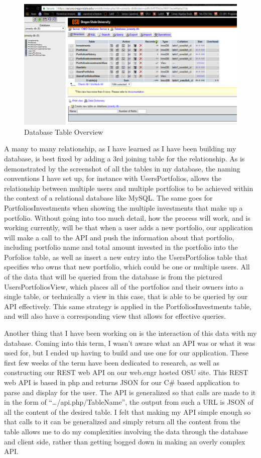 \documentclass[letterpaper,10pt,titlepage,journal,compsoc,draftclsnofoot,onecolumn]{IEEEtran}
\begin{document}
\begin{figure}[h]
\caption{Database Table Overview}
\centering
\includegraphics[width=\textwidth]{database_overview}
\end{figure}
A many to many relationship, as I have learned as I have been building my database, is best fixed by adding a 3rd joining table for the relationship. As is demonstrated by the screenshot of all the tables in my database, the naming conventions I have set up, for instance with UsersPortfolios, allows the relationship between multiple users and multiple portfolios to be achieved within the context of a relational database like MySQL. The same goes for PortfoliosInvestments when showing the multiple investments that make up a portfolio. Without going into too much detail, how the process will work, and is working currently, will be that when a user adds a new portfolio, our application will make a call to the API and push the information about that portfolio, including portfolio name and total amount invested in the portfolio into the Porfolios table, as well as insert a new entry into the UsersPortfolios table that specifies who owns that new portfolio, which could be one or multiple users. All of the data that will be queried from the database is from the pictured UsersPortfoliosView, which places all of the portfolios and their owners into a single table, or technically a view in this case, that is able to be queried by our API effectively. This same strategy is applied in the PortfoliosInvestments table, and will also have a corresponding view that allows for effective queries.

Another thing that I have been working on is the interaction of this data with my database. Coming into this term, I wasn’t aware what an API was or what it was used for, but I ended up having to build and use one for our application. These first few weeks of the term have been dedicated to research, as well as constructing our REST web API on our web.engr hosted OSU site. This REST web API is based in php and returns JSON for our C\# based application to parse and display for the user.  The API is generalized so that calls are made to it in the form of “…/api.php/{TableName}”, the output from such a URL is JSON of all the content of the desired table. I felt that making my API simple enough so that calls to it can be generalized and simply return all the content from the table allows me to do my complexities involving the data  through the database and client side, rather than getting bogged down in making an overly complex API. 
\end{document}

